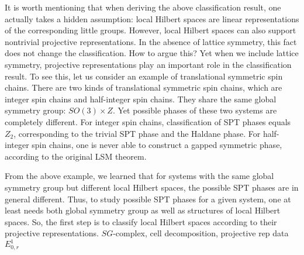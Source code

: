 \documentclass[reprint,amsmath,amssymb,aps,pra,]{revtex4-1}
\begin{document}
It is worth mentioning that when deriving the above classification result, one actually takes a hidden assumption: local Hilbert spaces are linear representations of the corresponding little groups.
However, local Hilbert spaces can also support nontrivial projective representations.
In the absence of lattice symmetry, this fact does not change the classification. {\color{red} How to argue this?}
Yet when we include lattice symmetry, projective representations play an important role in the classification result.
To see this, let us consider an example of translational symmetric spin chains.
There are two kinds of translational symmetric spin chains, which are integer spin chains and half-integer spin chains.
They share the same global symmetry group: $SO(3)\times Z$. 
Yet possible phases of these two systems are completely different.
For integer spin chains, classification of SPT phases equals $Z_2$, corresponding to the trivial SPT phase and the Haldane phase.
For half-integer spin chains, one is never able to construct a gapped symmetric phase, according to the original LSM theorem.

From the above example, we learned that for systems with the same global symmetry group but different local Hilbert spaces, the possible SPT phases are in general different.
Thus, to study possible SPT phases for a given system, one at least needs both global symmetry group as well as structures of local Hilbert spaces.
So, the first step is to classify local Hilbert spaces according to their projective representations.
{\color{red} $SG$-complex, cell decomposition, projective rep data $E^1_{0,r}$}

\end{document}
